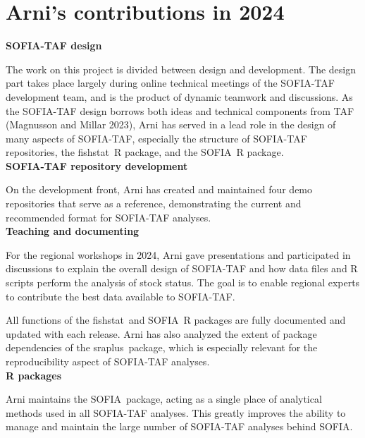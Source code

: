 \documentclass[12pt]{article}
\newcommand\fishstat{{\sf fishstat}}
\newcommand\SOFIA{{\sf SOFIA}}
\newcommand\sraplus{{\sf sraplus}}
\begin{document}
\normalsize

\newpage

\appendix


\section{Arni's contributions in 2024}

\textbf{SOFIA-TAF design}

The work on this project is divided between design and development. The design
part takes place largely during online technical meetings of the SOFIA-TAF
development team, and is the product of dynamic teamwork and discussions. As the
SOFIA-TAF design borrows both ideas and technical components from TAF (Magnusson
and Millar 2023), Arni has served in a lead role in the design of many aspects
of SOFIA-TAF, especially the structure of SOFIA-TAF repositories, the \fishstat\
R package, and the \SOFIA\ R package.\\[-2ex]

\textbf{SOFIA-TAF repository development}

On the development front, Arni has created and maintained four demo repositories
that serve as a reference, demonstrating the current and
recommended format for SOFIA-TAF analyses.\\[-2ex]

\textbf{Teaching and documenting}

For the regional workshops in 2024, Arni gave presentations and participated in
discussions to explain the overall design of SOFIA-TAF and how data files and R
scripts perform the analysis of stock status. The goal is to enable regional
experts to contribute the best data available to SOFIA-TAF.

All functions of the \fishstat\ and \SOFIA\ R packages are fully documented and
updated with each release. Arni has also analyzed the extent of package
dependencies of the \sraplus\ package, which is especially relevant for the
reproducibility aspect of SOFIA-TAF analyses.\\[-2ex]

\textbf{R packages}

Arni maintains the \SOFIA\ package, acting as a single place of analytical
methods used in all SOFIA-TAF analyses. This greatly improves the ability to
manage and maintain the large number of SOFIA-TAF analyses behind SOFIA.
\end{document}
